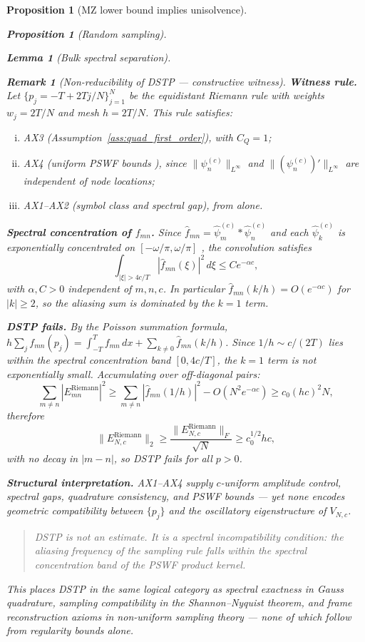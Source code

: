 \documentclass[12pt,a4paper]{amsart}
\newtheorem{lemma}[theorem]{Lemma}
\newtheorem{proposition}[theorem]{Proposition}
\theoremstyle{definition}
\newtheorem{remark}[theorem]{Remark}
\begin{document}
\begin{proposition}[MZ lower bound implies unisolvence]
\begin{proposition}[Random sampling]
\begin{lemma}[Bulk spectral separation]
\begin{remark}[Non-reducibility of \textup{DSTP} --- constructive witness]
\smallskip
\noindent\textbf{Witness rule.}
Let $\{p_j=-T+2Tj/N\}_{j=1}^N$ be the equidistant Riemann rule
with weights $w_j=2T/N$ and mesh $h=2T/N$.
This rule satisfies:
\begin{enumerate}[(i)]
\item \textup{AX3} (Assumption~\ref{ass:quad_first_order}),
  with $C_Q=1$;
\item \textup{AX4} (uniform PSWF bounds \cite{BonamiKaroui2014}),
  since $\|\psi_n^{(c)}\|_{L^\infty}$ and
  $\|(\psi_n^{(c)})'\|_{L^\infty}$ are independent of node locations;
\item \textup{AX1--AX2} (symbol class and spectral gap), from
  \cite{PaperIV,OsipovRokhlinXiao} alone.
\end{enumerate}

\smallskip
\noindent\textbf{Spectral concentration of $f_{mn}$.}
Since $\hat{f}_{mn}=\hat{\psi}_m^{(c)}\ast\hat{\psi}_n^{(c)}$
and each $\hat{\psi}_k^{(c)}$ is exponentially concentrated on
$[-\omega/\pi,\omega/\pi]$ \cite{BonamiKaroui}, the convolution
satisfies
\[
  \int_{|\xi|>4c/T}|\hat{f}_{mn}(\xi)|^2\,d\xi\le Ce^{-\alpha c},
\]
with $\alpha,C>0$ independent of $m,n,c$.
In particular $\hat{f}_{mn}(k/h)=O(e^{-\alpha c})$ for $|k|\ge 2$,
so the aliasing sum is dominated by the $k=1$ term.

\smallskip
\noindent\textbf{DSTP fails.}
By the Poisson summation formula,
$h\sum_j f_{mn}(p_j)=\int_{-T}^T f_{mn}\,dx
+\sum_{k\ne 0}\hat{f}_{mn}(k/h)$.
Since $1/h\sim c/(2T)$ lies within the spectral concentration band
$[0,4c/T]$, the $k=1$ term is not exponentially small.
Accumulating over off-diagonal pairs:
\[
  \sum_{m\ne n}|E_{mn}^{\mathrm{Riemann}}|^2
  \ge\sum_{m\ne n}|\hat{f}_{mn}(1/h)|^2-O(N^2e^{-\alpha c})
  \ge c_0(hc)^2N,
\]
therefore
\[
  \|E_{N,c}^{\mathrm{Riemann}}\|_2
  \ge\frac{\|E_{N,c}^{\mathrm{Riemann}}\|_F}{\sqrt{N}}
  \ge c_0^{1/2}hc,
\]
with no decay in $|m-n|$, so DSTP fails for all $p>0$.

\smallskip
\noindent\textbf{Structural interpretation.}
\textup{AX1--AX4} supply $c$-uniform amplitude control, spectral gaps,
quadrature consistency, and PSWF bounds --- yet none encodes geometric
compatibility between $\{p_j\}$ and the oscillatory eigenstructure
of $V_{N,c}$.
\begin{quotation}
  \noindent\textit{DSTP is not an estimate. It is a spectral
  incompatibility condition: the aliasing frequency of the sampling
  rule falls within the spectral concentration band of the PSWF
  product kernel.}
\end{quotation}
This places DSTP in the same logical category as spectral exactness
in Gauss quadrature, sampling compatibility in the Shannon--Nyquist
theorem, and frame reconstruction axioms in non-uniform sampling
theory --- none of which follow from regularity bounds alone.


\end{remark}
\end{lemma}
\end{proposition}
\end{proposition}
\end{document}
